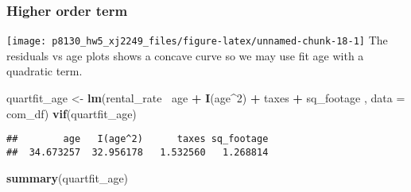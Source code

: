 \documentclass[]{article}
\newenvironment{Shaded}{\begin{snugshade}}{\end{snugshade}}
\newcommand{\DataTypeTok}[1]{\textcolor[rgb]{0.13,0.29,0.53}{#1}}
\newcommand{\DecValTok}[1]{\textcolor[rgb]{0.00,0.00,0.81}{#1}}
\newcommand{\KeywordTok}[1]{\textcolor[rgb]{0.13,0.29,0.53}{\textbf{#1}}}
\newcommand{\NormalTok}[1]{#1}
\newcommand{\OperatorTok}[1]{\textcolor[rgb]{0.81,0.36,0.00}{\textbf{#1}}}
\newcommand{\StringTok}[1]{\textcolor[rgb]{0.31,0.60,0.02}{#1}}
\begin{document}
\hypertarget{higher-order-term}{%
\subsubsection{Higher order term}\label{higher-order-term}}

\begin{Shaded}
\end{Shaded}

\texttt{[image: p8130\_hw5\_xj2249\_files/figure-latex/unnamed-chunk-18-1]}
The residuals vs age plots shows a concave curve so we may use fit age
with a quadratic term.

\begin{Shaded}
\begin{Highlighting}[]
\NormalTok{quartfit_age <-}\StringTok{ }\KeywordTok{lm}\NormalTok{(rental_rate }\OperatorTok{~}\NormalTok{age }\OperatorTok{+}\StringTok{ }\KeywordTok{I}\NormalTok{(age}\OperatorTok{^}\DecValTok{2}\NormalTok{) }\OperatorTok{+}\StringTok{ }\NormalTok{taxes }\OperatorTok{+}\StringTok{ }\NormalTok{sq_footage , }\DataTypeTok{data =}\NormalTok{ com_df)}
\KeywordTok{vif}\NormalTok{(quartfit_age)}
\end{Highlighting}
\end{Shaded}

\begin{verbatim}
##        age   I(age^2)      taxes sq_footage 
##  34.673257  32.956178   1.532560   1.268814
\end{verbatim}

\begin{Shaded}
\begin{Highlighting}[]
\KeywordTok{summary}\NormalTok{(quartfit_age)}
\end{Highlighting}
\end{Shaded}
\end{document}
